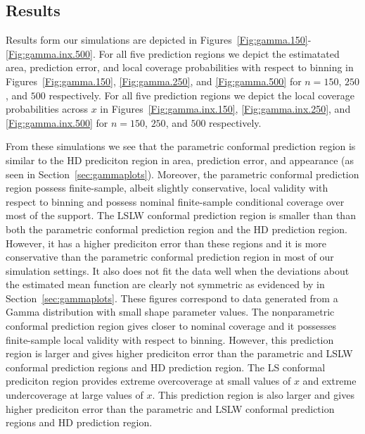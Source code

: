 \documentclass[11pt]{article}\usepackage[]{graphicx}\usepackage[]{color}
\begin{document}
\newpage
\subsection{Results}
\label{sec:Gamma-Results}

Results form our simulations are depicted in 
Figures~\ref{Fig:gamma.150}-\ref{Fig:gamma.inx.500}.  
For all five prediction regions we depict the estimatated area, prediction 
error, and local coverage probabilities with respect to binning in 
Figures~\ref{Fig:gamma.150}, \ref{Fig:gamma.250}, and \ref{Fig:gamma.500} 
for $n = 150$, $250$, and $500$ respectively.  For all five prediction 
regions we depict the local coverage probabilities across $x$ in
Figures~\ref{Fig:gamma.inx.150}, \ref{Fig:gamma.inx.250}, and 
\ref{Fig:gamma.inx.500} for $n = 150$, $250$, and $500$ respectively.

From these simulations we see that the parametric conformal prediction region 
is similar to the HD prediciton region in area, prediction error, and 
appearance (as seen in Section~\ref{sec:gammaplots}).  Moreover, the 
parametric conformal prediction region possess finite-sample, albeit slightly 
conservative, local validity with respect to binning and possess nominal 
finite-sample conditional coverage over most of the support. 
The LSLW conformal prediction region is smaller than than both the parametric 
conformal prediction region and the HD prediction region.  However, it has a 
higher prediciton error than these regions and it is more conservative than 
the parametric conformal prediction region in most of our simulation 
settings.  It also does not fit the data well when the deviations about the 
estimated mean function are clearly not symmetric as evidenced by 
in Section~\ref{sec:gammaplots}.  These figures correspond to data generated 
from a Gamma distribution with small shape parameter values.  
The nonparametric conformal prediction region gives closer to nominal 
coverage and it possesses finite-sample local validity with respect to 
binning.  However, this prediction region is larger and gives higher 
prediciton error than the parametric and LSLW conformal prediction 
regions and HD prediction region.  The LS conformal prediciton region 
provides extreme overcoverage at small values of $x$ and extreme 
undercoverage at large values of $x$.  This prediction region is also larger 
and gives higher prediciton error than the parametric and LSLW conformal 
prediction regions and HD prediction region.
\end{document}
